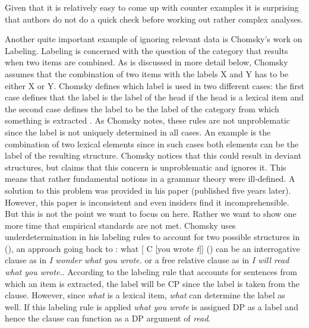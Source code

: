 \documentclass[output=paper]{langsci/langscibook}
\begin{document}
\zl
%
Given that it is relatively easy to come up with counter examples it is surprising that authors do
not do a quick check before working out rather complex analyses.

Another quite important example of ignoring relevant data is Chomsky's work on Labeling. Labeling is
concerned with the question of the category that results when two items are combined. As is
discussed in more detail below, Chomsky assumes that the combination of two items with the labels X and Y has to be either X or Y. Chomsky
defines which label is used in two different cases: the first case defines that the label is the
label of the head if the head is a lexical item and the second case defines the label to be the
label of the category from which something is extracted \citep[]{Chomsky2008a}. 
As Chomsky notes, these rules are not unproblematic since the label is not uniquely determined in all
cases. An example is the combination of two lexical elements since in such cases both elements can
be the label of the resulting structure. Chomsky notices that this could result in deviant structures, but
claims that this concern is unproblematic and ignores it. This means that rather fundamental notions
in a grammar theory were ill-defined. A solution to this problem was provided in his
\citeyear{Chomsky2013a} paper (published five years later). However, this paper is inconsistent \citep[Section~4.6.2]{MuellerGT-Eng1} and
even insiders find it incomprehensible. But this is not the point we want to focus on here. Rather
we want to show one more time that empirical standards are not met. Chomsky uses underdetermination
in his labeling rules to account for two possible structures in (), an approach going back to
:
\ea
\label{ex-what-you-wrote}
what [ C [you wrote \emph{t}]]
\z
() can be an interrogative clause as in \emph{I wonder what you wrote.} or a free relative
clause as in \emph{I will read what you wrote.}. According to the labeling rule that accounts for
sentences from which an item is extracted, the label will be CP since the label is taken from the
clause. However, since \emph{what} is a lexical item, \emph{what} can determine the label as
well. If this labeling rule is applied \emph{what you wrote} is assigned DP as a label and hence the
clause can function as a DP argument of \emph{read}. 
\end{document}
